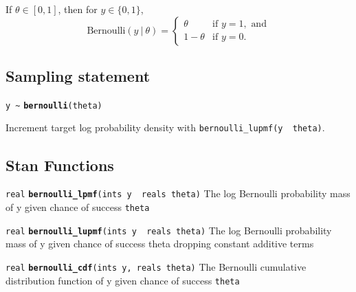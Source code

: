 \documentclass[
  10pt,
]{book}
\begin{document}
If \(\theta \in [0,1]\), then for \(y \in \{0,1\}\), \[
\text{Bernoulli}(y~|~\theta) = \left\{ \begin{array}{ll} \theta &
\text{if } y = 1, \text{ and} \\ 1 - \theta & \text{if } y = 0.
\end{array} \right. \]

\hypertarget{sampling-statement}{%
\subsection{Sampling statement}\label{sampling-statement}}

\texttt{y\ \textasciitilde{}} \textbf{\texttt{bernoulli}}\texttt{(theta)}

Increment target log probability density with \texttt{bernoulli\_lupmf(y\ \textbar{}\ theta)}.

\hypertarget{stan-functions}{%
\subsection{Stan Functions}\label{stan-functions}}


\texttt{real} \textbf{\texttt{bernoulli\_lpmf}}\texttt{(ints\ y\ \textbar{}\ reals\ theta)}\newline
The log Bernoulli probability mass of y given chance of success \texttt{theta}


\texttt{real} \textbf{\texttt{bernoulli\_lupmf}}\texttt{(ints\ y\ \textbar{}\ reals\ theta)}\newline
The log Bernoulli probability mass of y given chance of success theta
dropping constant additive terms


\texttt{real} \textbf{\texttt{bernoulli\_cdf}}\texttt{(ints\ y,\ reals\ theta)}\newline
The Bernoulli cumulative distribution function of y given chance of
success \texttt{theta}

\end{document}
